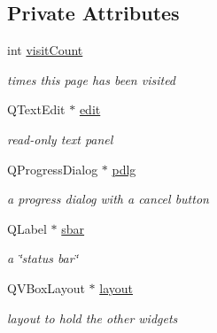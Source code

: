 \subsection*{Private Attributes}
\begin{CompactItemize}
\item 
\hypertarget{classTraceRunWizardPage_0e701277e034d330bc6f8e6360954439}{
int \hyperlink{classTraceRunWizardPage_0e701277e034d330bc6f8e6360954439}{visitCount}}
\label{classTraceRunWizardPage_0e701277e034d330bc6f8e6360954439}

\begin{CompactList}\small\item\em times this page has been visited \item\end{CompactList}\item 
\hypertarget{classTraceRunWizardPage_9343eede6d5c0e187bd2431b25cc9e9f}{
QTextEdit $\ast$ \hyperlink{classTraceRunWizardPage_9343eede6d5c0e187bd2431b25cc9e9f}{edit}}
\label{classTraceRunWizardPage_9343eede6d5c0e187bd2431b25cc9e9f}

\begin{CompactList}\small\item\em read-only text panel \item\end{CompactList}\item 
\hypertarget{classTraceRunWizardPage_32b1fe05a5c6536fd8217e325c2cdd3e}{
QProgressDialog $\ast$ \hyperlink{classTraceRunWizardPage_32b1fe05a5c6536fd8217e325c2cdd3e}{pdlg}}
\label{classTraceRunWizardPage_32b1fe05a5c6536fd8217e325c2cdd3e}

\begin{CompactList}\small\item\em a progress dialog with a cancel button \item\end{CompactList}\item 
\hypertarget{classTraceRunWizardPage_2853d5b9891b6f5187f230bf08032948}{
QLabel $\ast$ \hyperlink{classTraceRunWizardPage_2853d5b9891b6f5187f230bf08032948}{sbar}}
\label{classTraceRunWizardPage_2853d5b9891b6f5187f230bf08032948}

\begin{CompactList}\small\item\em a \char`\"{}status bar\char`\"{} \item\end{CompactList}\item 
\hypertarget{classTraceRunWizardPage_af8276e04b37c80a69285d4f3604a7d5}{
QVBoxLayout $\ast$ \hyperlink{classTraceRunWizardPage_af8276e04b37c80a69285d4f3604a7d5}{layout}}
\label{classTraceRunWizardPage_af8276e04b37c80a69285d4f3604a7d5}

\begin{CompactList}\small\item\em layout to hold the other widgets \item\end{CompactList}\end{CompactItemize}
